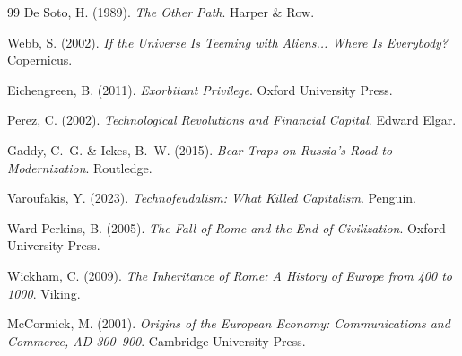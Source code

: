 \begin{thebibliography}{99}
De Soto, H. (1989). \textit{The Other Path}. Harper \& Row.

Webb, S. (2002). \textit{If the Universe Is Teeming with Aliens... Where Is Everybody?} Copernicus.

Eichengreen, B. (2011). \textit{Exorbitant Privilege}. Oxford University Press.

Perez, C. (2002). \textit{Technological Revolutions and Financial Capital}. Edward Elgar.

Gaddy, C.~G. \& Ickes, B.~W. (2015). \textit{Bear Traps on Russia's Road to Modernization}. Routledge.

Varoufakis, Y. (2023). \textit{Technofeudalism: What Killed Capitalism}. Penguin.

Ward-Perkins, B. (2005). \textit{The Fall of Rome and the End of Civilization}. Oxford University Press.

Wickham, C. (2009). \textit{The Inheritance of Rome: A History of Europe from 400 to 1000}. Viking.

McCormick, M. (2001). \textit{Origins of the European Economy: Communications and Commerce, AD 300--900}. Cambridge University Press.

\end{thebibliography}
